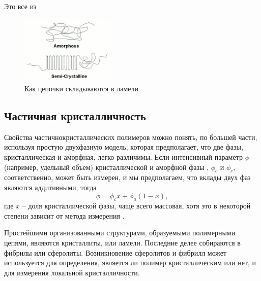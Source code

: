 Это все из \cite{cryst1}

	\begin{figure} 
\vspace{-20pt}


  \begin{center}
    \includegraphics[width=0.4\textwidth]{fig/crystal-1.png}
    \caption{Как цепочки складываются в ламели}
    \label{fig:crystal-1}
  \end{center}
  \vspace{-20pt}
  \vspace{1pt}
\end{figure}






\subsection{Частичная кристалличность}

Свойства частичнокристаллических полимеров можно понять, по большей части,
используя простую двухфазную модель, которая предполагает, что две фазы, кристаллическая и аморфная, легко различимы. Если интенсивный параметр  $\phi$ (например, удельный объем) кристаллической и аморфной фазы , $\phi_c$ и $\phi_c$, соответственно, может быть измерен, и мы предполагаем, что вклады двух фаз являются аддитивными, тогда
\[ 
\phi = \phi_c x + \phi_a(1-x),
\]
где $x$  -- доля кристаллической фазы, чаще всего массовая, хотя это в некоторой степени зависит от метода измерения \cite{cryst3}.

Простейшими организованными структурами, образуемыми полимерными цепями, являются кристаллиты, или ламели. Последние делее собираются в фибрилы или сферолиты. Возникновение сферолитов и фибрилл может
используется для определения, является ли полимер кристаллическим или нет, и для измерения локальной кристалличности.

